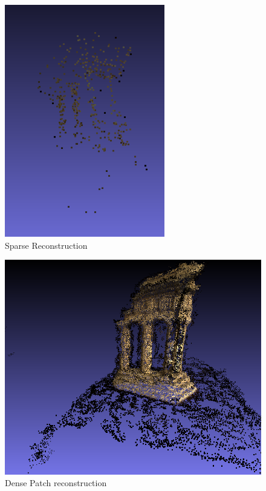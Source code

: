 \documentclass[10pt,twocolumn,letterpaper]{article}
\begin{document}
\begin{figure}[t]
  \begin{center}
    \includegraphics[width=0.8\linewidth]{sparse.png}
  \end{center}
  \caption{Sparse Reconstruction}
  \label{fig:long}
  \label{fig:onecol}
\end{figure}

\begin{figure}[t]
\begin{center}
\includegraphics[width=0.8\linewidth]{patches.png}
\end{center}
\caption{Dense Patch reconstruction}
\label{fig:long}
\label{fig:onecol}
\end{figure}
\end{document}
